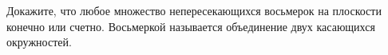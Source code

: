 Докажите, что любое множество непересекающихся восьмерок на плоскости конечно или счетно. Восьмеркой называется объединение
двух касающихся окружностей.